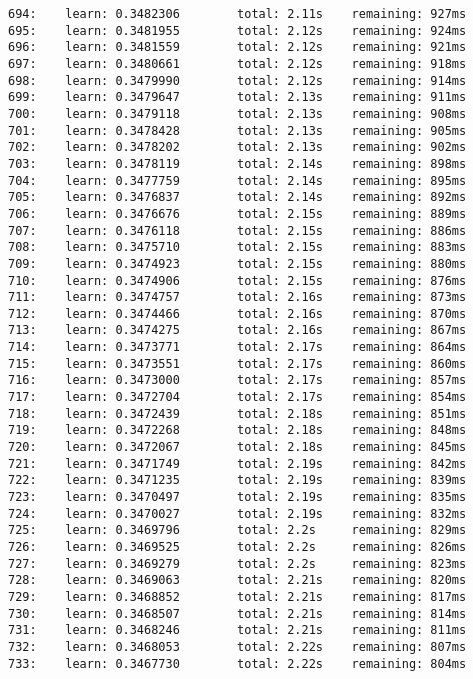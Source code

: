 \documentclass[11pt]{article}
\begin{document}
\begin{Verbatim}[commandchars=\\\{\}]
694:    learn: 0.3482306        total: 2.11s    remaining: 927ms
695:    learn: 0.3481955        total: 2.12s    remaining: 924ms
696:    learn: 0.3481559        total: 2.12s    remaining: 921ms
697:    learn: 0.3480661        total: 2.12s    remaining: 918ms
698:    learn: 0.3479990        total: 2.12s    remaining: 914ms
699:    learn: 0.3479647        total: 2.13s    remaining: 911ms
700:    learn: 0.3479118        total: 2.13s    remaining: 908ms
701:    learn: 0.3478428        total: 2.13s    remaining: 905ms
702:    learn: 0.3478202        total: 2.13s    remaining: 902ms
703:    learn: 0.3478119        total: 2.14s    remaining: 898ms
704:    learn: 0.3477759        total: 2.14s    remaining: 895ms
705:    learn: 0.3476837        total: 2.14s    remaining: 892ms
706:    learn: 0.3476676        total: 2.15s    remaining: 889ms
707:    learn: 0.3476118        total: 2.15s    remaining: 886ms
708:    learn: 0.3475710        total: 2.15s    remaining: 883ms
709:    learn: 0.3474923        total: 2.15s    remaining: 880ms
710:    learn: 0.3474906        total: 2.15s    remaining: 876ms
711:    learn: 0.3474757        total: 2.16s    remaining: 873ms
712:    learn: 0.3474466        total: 2.16s    remaining: 870ms
713:    learn: 0.3474275        total: 2.16s    remaining: 867ms
714:    learn: 0.3473771        total: 2.17s    remaining: 864ms
715:    learn: 0.3473551        total: 2.17s    remaining: 860ms
716:    learn: 0.3473000        total: 2.17s    remaining: 857ms
717:    learn: 0.3472704        total: 2.17s    remaining: 854ms
718:    learn: 0.3472439        total: 2.18s    remaining: 851ms
719:    learn: 0.3472268        total: 2.18s    remaining: 848ms
720:    learn: 0.3472067        total: 2.18s    remaining: 845ms
721:    learn: 0.3471749        total: 2.19s    remaining: 842ms
722:    learn: 0.3471235        total: 2.19s    remaining: 839ms
723:    learn: 0.3470497        total: 2.19s    remaining: 835ms
724:    learn: 0.3470027        total: 2.19s    remaining: 832ms
725:    learn: 0.3469796        total: 2.2s     remaining: 829ms
726:    learn: 0.3469525        total: 2.2s     remaining: 826ms
727:    learn: 0.3469279        total: 2.2s     remaining: 823ms
728:    learn: 0.3469063        total: 2.21s    remaining: 820ms
729:    learn: 0.3468852        total: 2.21s    remaining: 817ms
730:    learn: 0.3468507        total: 2.21s    remaining: 814ms
731:    learn: 0.3468246        total: 2.21s    remaining: 811ms
732:    learn: 0.3468053        total: 2.22s    remaining: 807ms
733:    learn: 0.3467730        total: 2.22s    remaining: 804ms

\end{Verbatim}
\end{document}
